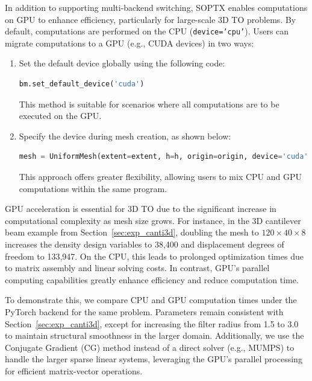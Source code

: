\documentclass[mathpazo]{cicp}
\begin{document}
In addition to supporting multi-backend switching, SOPTX enables computations on GPU to enhance efficiency, particularly for large-scale 3D TO problems. By default, computations are performed on the CPU (\texttt{device='cpu'}). Users can migrate computations to a GPU (e.g., CUDA devices) in two ways:
\begin{enumerate}
	\item Set the default device globally using the following code:
\begin{lstlisting}[language=python]
bm.set_default_device('cuda')
\end{lstlisting}
	This method is suitable for scenarios where all computations are to be executed on the GPU.
	\item Specify the device during mesh creation, as shown below:
\begin{lstlisting}[language=python]
mesh = UniformMesh(extent=extent, h=h, origin=origin, device='cuda')
\end{lstlisting}
	This approach offers greater flexibility, allowing users to mix CPU and GPU computations within the same program.	
\end{enumerate}

GPU acceleration is essential for 3D TO due to the significant increase in computational complexity as mesh size grows. For instance, in the 3D cantilever beam example from Section~\ref{sec:exp_canti3d}, doubling the mesh to $120\times40\times8$ increases the density design variables to 38,400 and displacement degrees of freedom to 133,947. On the CPU, this leads to prolonged optimization times due to matrix assembly and linear solving costs. In contrast, GPU's parallel computing capabilities greatly enhance efficiency and reduce computation time.

To demonstrate this, we compare CPU and GPU computation times under the PyTorch backend for the same problem. Parameters remain consistent with Section~\ref{sec:exp_canti3d}, except for increasing the filter radius from 1.5 to 3.0 to maintain structural smoothness in the larger domain. Additionally, we use the Conjugate Gradient (CG) method instead of a direct solver (e.g., MUMPS) to handle the larger sparse linear systems, leveraging the GPU's parallel processing for efficient matrix-vector operations.
\end{document}
